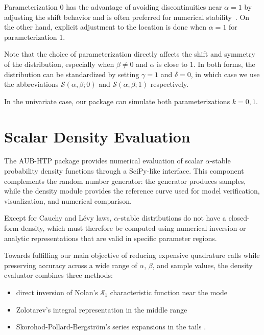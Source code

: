 Parameterization 0 has the advantage of avoiding discontinuities near $\alpha = 1$ by adjusting the shift behavior and is often preferred for numerical stability~\citep{NolanJohnP2020USDM}.
On the other hand, explicit adjustment to the location is done when $\alpha = 1$ for parameterization 1.


Note that the choice of parameterization directly affects the shift and symmetry of the distribution, especially when $\beta \neq 0$ and $\alpha$ is close to $1$. In both forms, the distribution can be standardized by setting $\gamma = 1$ and $\delta = 0$, in which case we use the abbreviations $\mathcal{S}(\alpha, \beta; 0)$ and $\mathcal{S}(\alpha, \beta; 1)$ respectively.

In the univariate case, our package can simulate both parameterizations $k=0,1$.


\section{Scalar Density Evaluation}

The AUB-HTP package provides numerical evaluation of scalar $\alpha$-stable probability density functions through a SciPy-like interface. This component complements the random number generator: the generator produces samples, while the density module provides the reference curve used for model verification, visualization, and numerical comparison.

Except for  Cauchy and L\'evy laws, $\alpha$-stable distributions do not have a closed-form density, which must therefore be computed using numerical inversion or analytic representations that are valid in specific parameter regions.



Towards fulfilling our main objective of reducing expensive quadrature calls while preserving accuracy across a wide range of $\alpha$, $\beta$, and sample values, the density evaluator combines three methods:
\begin{itemize}
\item[(a)] direct inversion of Nolan's $\mathcal{S}_1$ characteristic function near the mode \citep{NolanJohnP2020USDM}
\item[(b)] Zolotarev's integral representation in the middle range \citep{Zolotarev1986}
\item[(c)] Skorohod-Pollard-Bergstr{\"o}m's series expansions in the tails \citep{sko2, Wintner1941CauchySingularities, Pollard1946LaplaceIntegral}.
\end{itemize}




